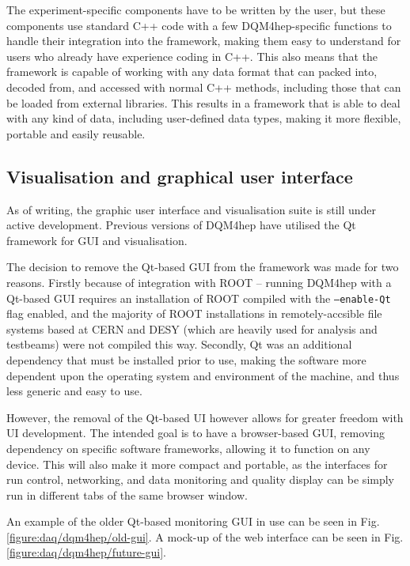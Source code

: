 The experiment-specific components have to be written by the user, but these components use standard C++ code with a few DQM4hep-specific functions to handle their integration into the framework, making them easy to understand for users who already have experience coding in C++. This also means that the framework is capable of working with any data format that can packed into, decoded from, and accessed with normal C++ methods, including those that can be loaded from external libraries. This results in a framework that is able to deal with any kind of data, including user-defined data types, making it more flexible, portable and easily reusable.

\subsection{Visualisation and graphical user interface}
As of writing, the graphic user interface and visualisation suite is still under active development. Previous versions of DQM4hep have utilised the Qt framework for GUI and visualisation.

The decision to remove the Qt-based GUI from the framework was made for two reasons. Firstly because of integration with ROOT -- running DQM4hep with a Qt-based GUI requires an installation of ROOT compiled with the \texttt{--enable-Qt} flag enabled, and the majority of ROOT installations in remotely-accsible file systems based at CERN and DESY (which are heavily used for analysis and testbeams) were not compiled this way. Secondly, Qt was an additional dependency that must be installed prior to use, making the software more dependent upon the operating system and environment of the machine, and thus less generic and easy to use.

However, the removal of the Qt-based UI however allows for greater freedom with UI development. The intended goal is to have a browser-based GUI, removing dependency on specific software frameworks, allowing it to function on any device. This will also make it more compact and portable, as the interfaces for run control, networking, and data monitoring and quality display can be simply run in different tabs of the same browser window.

An example of the older Qt-based monitoring GUI in use can  be seen in Fig. \ref{figure:daq/dqm4hep/old-gui}. A mock-up of the web interface can be seen in Fig. \ref{figure:daq/dqm4hep/future-gui}.

